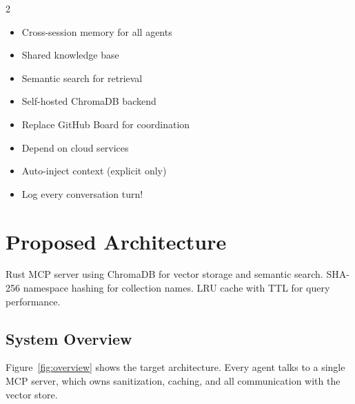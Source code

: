 \documentclass[11pt,letterpaper]{article}
\begin{document}
\begin{multicols}{2}
\begin{tipbox}[Goals]
\begin{itemize}
  \item Cross-session memory for all agents
  \item Shared knowledge base
  \item Semantic search for retrieval
  \item Self-hosted ChromaDB backend
\end{itemize}
\end{tipbox}

\columnbreak

\begin{warnbox}
\begin{itemize}
  \item Replace GitHub Board for coordination
  \item Depend on cloud services
  \item Auto-inject context (explicit only)
  \item \textcolor{dangerred}{Log every conversation turn!}
\end{itemize}
\end{warnbox}
\end{multicols}

\section{Proposed Architecture}

\begin{tldrbox}
Rust MCP server using ChromaDB for vector storage and semantic search. SHA-256 namespace hashing for collection names. LRU cache with TTL for query performance.
\end{tldrbox}

\subsection{System Overview}

Figure~\ref{fig:overview} shows the target architecture. Every agent talks to a single MCP server, which owns sanitization, caching, and all communication with the vector store.
\end{document}
